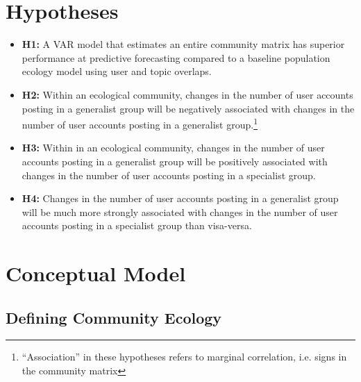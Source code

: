 \documentclass[12pt]{memoir}
\begin{document}
\section{Hypotheses}
\begin{itemize}

\item \textbf{H1:} A VAR model that estimates an entire community matrix has superior performance at predictive forecasting compared to a baseline population ecology model using user and topic overlaps.

\item \textbf{H2:} Within an ecological community, changes in the number of user accounts posting in a generalist group will be negatively associated with changes in the number of user accounts posting in a generalist group.\footnote{``Association'' in these hypotheses refers to marginal correlation, i.e. signs in the community matrix}

\item \textbf{H3:} Within in an ecological community, changes in the number of user accounts posting in a generalist group will be positively associated with changes in the number of user accounts posting in a specialist group.

\item \textbf{H4:} Changes in the number of user accounts posting in a generalist group will be much more strongly associated with changes in the number of user accounts posting in a specialist group than visa-versa.

\end{itemize}

\section{Conceptual Model}

\label{sec:conc-modeld}

\subsection{Defining Community Ecology}
\end{document}
